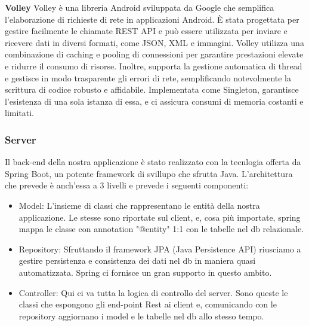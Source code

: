 \begin{flushleft}
        \textbf{Volley} Volley è una libreria Android sviluppata da Google che semplifica l'elaborazione di richieste di rete in applicazioni Android. È stata progettata per gestire facilmente le chiamate REST API e può essere utilizzata per inviare e ricevere dati in diversi formati, come JSON, XML e immagini.
        Volley utilizza una combinazione di caching e pooling di connessioni per garantire prestazioni elevate e ridurre il consumo di risorse. Inoltre, supporta la gestione automatica di thread e gestisce in modo trasparente gli errori di rete, semplificando notevolmente la scrittura di codice robusto e affidabile.
        Implementata come Singleton, garantisce l'esistenza di una sola istanza di essa, e ci assicura consumi di memoria costanti e limitati.
    \end{flushleft}
    \vspace{0.2cm}


    \subsubsection{Server}
    \begin{flushleft}
        Il back-end della nostra applicazione è stato realizzato con la tecnlogia offerta da Spring Boot, un potente framework di svillupo che sfrutta Java.
        L'architettura che prevede è anch'essa a 3 livelli e prevede i seguenti componenti:
        \begin{itemize}
            \item Model: L'insieme di classi che rappresentano le entità della nostra applicazione. Le stesse sono riportate sul client, e, cosa più importate, spring mappa le classe con annotation "@entity" 1:1 con le tabelle nel db relazionale.\\
                
            \item Repository: Sfruttando il framework JPA (Java Persistence API) riusciamo a gestire persistenza e consistenza dei dati nel db in maniera quasi automatizzata. Spring ci fornisce un gran supporto in questo ambito.
            \item Controller: Qui ci va tutta la logica di controllo del server. Sono queste le classi che espongono gli end-point Rest ai client e, comunicando con le repository aggiornano i model e le tabelle nel db allo stesso tempo.
        \end{itemize}
    \end{flushleft}

